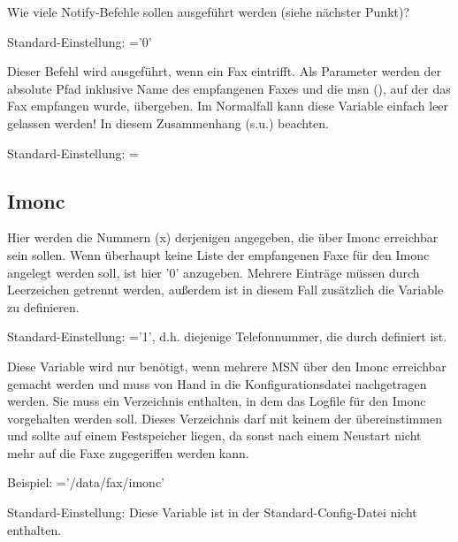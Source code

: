 \begin {description}


    {Wie viele Notify-Befehle sollen ausgeführt werden (siehe nächster Punkt)?

        Standard-Einstellung: ='0'}


    {Dieser Befehl wird ausgeführt, wenn ein Fax eintrifft. Als Parameter
    werden der absolute Pfad inklusive Name des empfangenen Faxes und die
    msn (), auf der das Fax empfangen wurde, übergeben.
    Im Normalfall kann diese Variable einfach leer gelassen werden!
    In diesem Zusammenhang  (s.u.) beachten.

        Standard-Einstellung: =\dq{}}

\end {description}

\subsection{Imonc}

\begin {description}


    {Hier werden die Nummern (x) derjenigen  angegeben,
    die über Imonc erreichbar sein sollen. Wenn überhaupt keine Liste der
    empfangenen Faxe für den Imonc angelegt werden soll, ist hier '0'
    anzugeben.
    Mehrere Einträge müssen durch Leerzeichen getrennt werden,
    außerdem ist in diesem Fall zusätzlich die Variable
     zu definieren.

        Standard-Einstellung:
            ='1', d.h. diejenige Telefonnummer,
                die durch  definiert ist.}


    {Diese Variable wird nur benötigt, wenn mehrere MSN über den Imonc
    erreichbar gemacht werden und muss von Hand in die Konfigurationsdatei
    nachgetragen werden.
    Sie muss ein Verzeichnis enthalten, in dem das Logfile für den Imonc
    vorgehalten werden soll. Dieses Verzeichnis darf mit keinem der
     übereinstimmen und sollte auf einem
    Festspeicher liegen, da sonst nach einem Neustart nicht mehr auf die
    Faxe zugegeriffen werden kann.

        Beispiel:
            ='/data/fax/imonc'

        Standard-Einstellung:
            Diese Variable ist in der Standard-Config-Datei nicht enthalten.}

\end{description}

